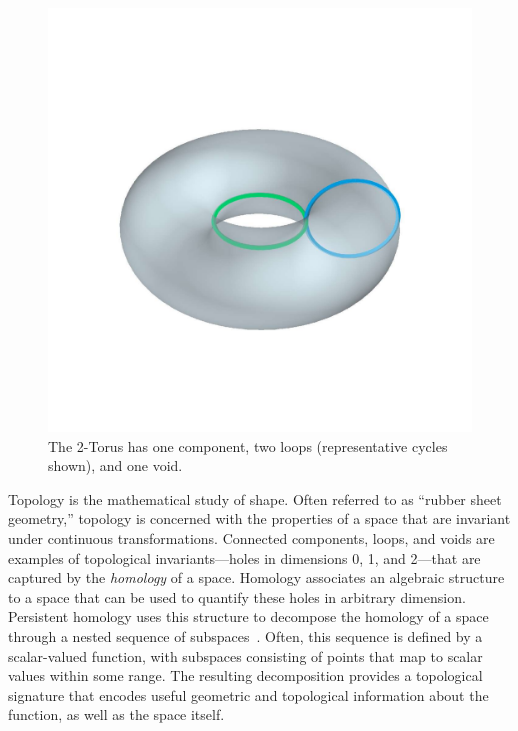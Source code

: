 

\begin{figure}
  \centering
  \vspace{-3ex}
  \includegraphics[trim=300 400 300 400, clip, width=\linewidth]{figures/torus1_light-comp.pdf}
    \caption{The 2-Torus has one component, two loops (representative cycles shown), and one void.}
\end{figure}

Topology is the mathematical study of shape.
Often referred to as ``rubber sheet geometry,'' topology is concerned with the properties of a space that are invariant under continuous transformations.
Connected components, loops, and voids are examples of topological invariants---holes in dimensions 0, 1, and 2---that are captured by the \emph{homology} of a space.
Homology associates an algebraic structure to a space that can be used to quantify these holes in arbitrary dimension.
Persistent homology uses this structure to decompose the homology of a space through a nested sequence of subspaces~\cite{edelsbrunner02simplification}.
Often, this sequence is defined by a scalar-valued function, with subspaces consisting of points that map to scalar values within some range.
The resulting decomposition provides a topological signature that encodes useful geometric and topological information about the function, as well as the space itself.

